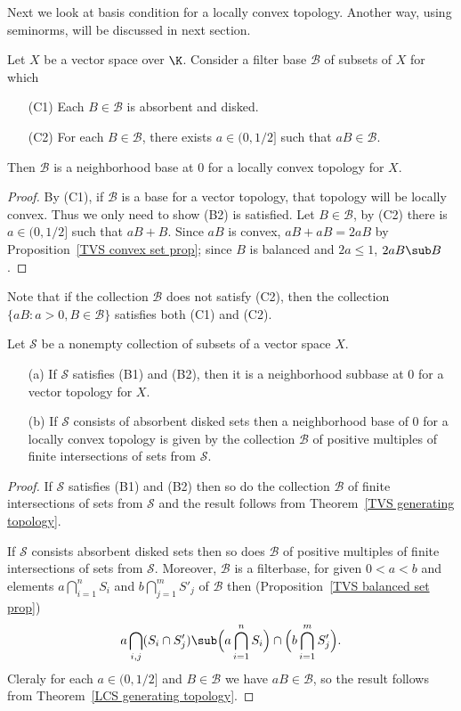 Next we look at basis condition for a locally convex topology. Another way, using seminorms, will be discussed in next section.
\begin{theorem}\label{LCS generating topology}
Let $X$ be a vector space over $\K$. Consider a filter base $\mathcal{B}$ of subsets of $X$ for which
\begin{itemize}
\item[(C1)] Each $B\in\mathcal{B}$ is absorbent and disked. 
\item[(C2)] For each $B\in\mathcal{B}$, there exists $a\in(0,1/2]$ such that $aB\in\mathcal{B}$.
\end{itemize}
Then $\mathcal{B}$ is a neighborhood base at $0$ for a locally convex topology for $X$.
\end{theorem}
\begin{proof}
By (C1), if $\mathcal{B}$ is a base for a vector topology, that topology will be locally convex. Thus we only need to show (B2) is satisfied. Let $B\in\mathcal{B}$, by (C2) there is $a\in(0,1/2]$ such that $aB+B$. Since $aB$ is convex, $aB+aB=2aB$ by Proposition~\ref{TVS convex set prop}; since $B$ is balanced and $2a\leq 1$, $2aB\sub B$.
\end{proof}
Note that if the collection $\mathcal{B}$ does not satisfy (C2), then the collection $\{aB:a>0,B\in\mathcal{B}\}$ satisfies both (C1) and (C2).
\begin{theorem}\label{TVS subbase generate topo}
Let $\mathcal{S}$ be a nonempty collection of subsets of a vector space $X$.
\begin{itemize}
\item[(a)] If $\mathcal{S}$ satisfies (B1) and (B2), then it is a neighborhood subbase at $0$ for a vector topology for $X$.
\item[(b)] If $\mathcal{S}$ consists of absorbent disked sets then a neighborhood base of $0$ for a locally convex topology is given by the collection $\mathcal{B}$ of positive multiples of finite intersections of sets from $\mathcal{S}$.
\end{itemize}
\end{theorem}
\begin{proof}
If $\mathcal{S}$ satisfies (B1) and (B2) then so do the collection $\mathcal{B}$ of finite intersections of sets from $\mathcal{S}$ and the result follows from Theorem~\ref{TVS generating topology}.\par
If $\mathcal{S}$ consists absorbent disked sets then so does $\mathcal{B}$ of positive multiples of finite intersections of sets from $\mathcal{S}$. Moreover, $\mathcal{B}$ is a filterbase, for given $0<a<b$ and elements $a\bigcap_{i=1}^{n}S_i$ and $b\bigcap_{j=1}^{m}S'_j$ of $\mathcal{B}$ then (Proposition~\ref{TVS balanced set prop})
\[a\bigcap_{i,j}(S_i\cap S_j')\sub\Big(a\bigcap_{i=1}^{n}S_i\Big)\cap\Big(b\bigcap_{i=1}^{m}S_j'\Big).\]
Cleraly for each $a\in(0,1/2]$ and $B\in\mathcal{B}$ we have $aB\in\mathcal{B}$, so the result follows from Theorem~\ref{LCS generating topology}. 
\end{proof}
